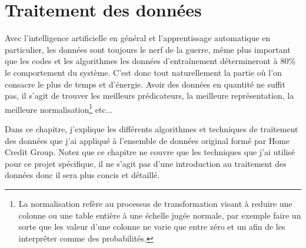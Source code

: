 \chapter{Traitement des données}
\label{chapter3}
Avec l'intelligence artificielle en général et l'apprentissage automatique en particulier, les données sont toujours le nerf de la guerre, même plus important que les codes et les algorithmes les données d'entraînement détermineront à 80\% le comportement du système. C'est donc tout naturellement la partie où l'on consacre le plus de temps et d'énergie. Avoir des données en quantité ne suffit pas, il s'agit de trouver les meilleurs prédicateurs, la meilleure représentation, la meilleure normalisation\footnote{La normalisation refère au processus de transformation visant à reduire une colonne ou une table entière à une échelle jugée normale, par exemple faire un sorte que les valeur d'une colonne ne varie que entre zéro et un afin de les interprêter comme des probabilités.} etc...

Dans ce chapitre, j'explique les différents algorithmes et techniques de traitement des données que j'ai appliqué à l'ensemble de données original formé par Home Credit Group. Notez que ce chapitre ne couvre que les techniques que j'ai utilisé pour ce projet spécifique, il ne s'agit pas d'une introduction au traitement des données donc il sera plus concis et détaillé.





\clearpage